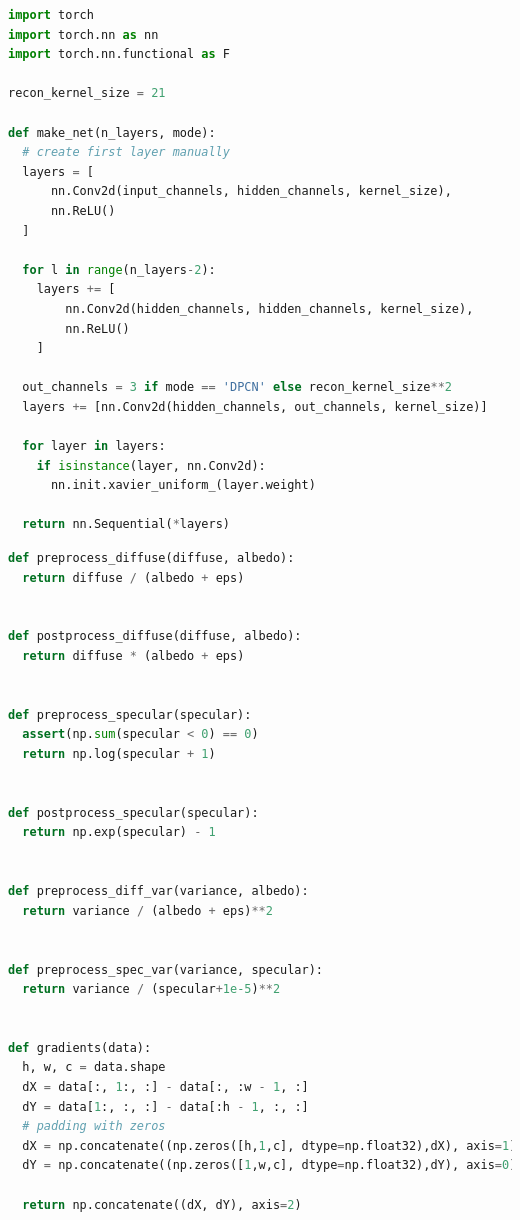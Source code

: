 \documentclass[times, utf8, seminar, numeric]{fer}
\begin{document}
\begin{lstlisting}[language=Python,
    basicstyle=\tiny,
    caption=Funkcija koja vraća inicijaliziranu podmrežu.]
import torch
import torch.nn as nn
import torch.nn.functional as F

recon_kernel_size = 21

def make_net(n_layers, mode):
  # create first layer manually
  layers = [
      nn.Conv2d(input_channels, hidden_channels, kernel_size),
      nn.ReLU()
  ]

  for l in range(n_layers-2):
    layers += [
        nn.Conv2d(hidden_channels, hidden_channels, kernel_size),
        nn.ReLU()
    ]

  out_channels = 3 if mode == 'DPCN' else recon_kernel_size**2
  layers += [nn.Conv2d(hidden_channels, out_channels, kernel_size)]

  for layer in layers:
    if isinstance(layer, nn.Conv2d):
      nn.init.xavier_uniform_(layer.weight)

  return nn.Sequential(*layers)
\end{lstlisting}


\begin{lstlisting}[language=Python,
    basicstyle=\tiny,
    caption=Funkcije za transformaciju podataka.]
def preprocess_diffuse(diffuse, albedo):
  return diffuse / (albedo + eps)


def postprocess_diffuse(diffuse, albedo):
  return diffuse * (albedo + eps)


def preprocess_specular(specular):
  assert(np.sum(specular < 0) == 0)
  return np.log(specular + 1)


def postprocess_specular(specular):
  return np.exp(specular) - 1


def preprocess_diff_var(variance, albedo):
  return variance / (albedo + eps)**2


def preprocess_spec_var(variance, specular):
  return variance / (specular+1e-5)**2


def gradients(data):
  h, w, c = data.shape
  dX = data[:, 1:, :] - data[:, :w - 1, :]
  dY = data[1:, :, :] - data[:h - 1, :, :]
  # padding with zeros
  dX = np.concatenate((np.zeros([h,1,c], dtype=np.float32),dX), axis=1)
  dY = np.concatenate((np.zeros([1,w,c], dtype=np.float32),dY), axis=0)

  return np.concatenate((dX, dY), axis=2)
\end{lstlisting}
\end{document}
